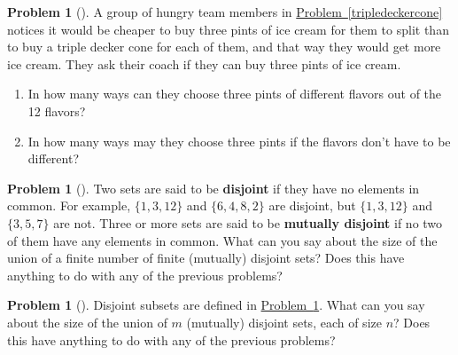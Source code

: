 \documentclass[10pt,]{book}
\newcommand{\terminology}[1]{\textbf{#1}}
\theoremstyle{plain}
\theoremstyle{definition}
\newtheorem{activity}[project]{Problem}
\theoremstyle{definition}
\numberwithin{equation}{chapter}
\begin{document}
\begin{activity}[] \label{icecreaminpints}
A group of hungry team members in \hyperref[tripledeckercone]{Problem~\ref{tripledeckercone}} notices it would be cheaper to buy three pints of ice cream for them to split than to buy a triple decker cone for each of them, and that way they would get more ice cream. They ask their coach if they can buy three pints of ice cream.%
\begin{enumerate}[font=\bfseries,label=(\alph*),ref=\alph*]
\item\label{task-11} \marginsymbol[-2.5em]{} In how many ways can they choose three pints of different flavors out of the 12 flavors?%
\item\label{task-12} \marginsymbol[-2.5em]{} In how many ways may they choose three pints if the flavors don't have to be different?%
\end{enumerate}
\end{activity}
\begin{activity}[] \label{sum}
Two sets are said to be \terminology{disjoint} if they have no elements in common. For example, \(\{1,3,12\}\) and \(\{6, 4, 8, 2\}\) are disjoint, but \(\{1,3,12\}\) and \(\{3,5,7\}\) are not. Three or more sets are said to be \terminology{mutually disjoint} if no two of them have any elements in common. What can you say about the size of the union of a finite number of finite (mutually) disjoint sets? Does this have anything to do with any of the previous problems?%
\end{activity}
\begin{activity}[] \label{product}
Disjoint subsets are defined in \hyperref[sum]{Problem~\ref{sum}}. What can you say about the size of the union of \(m\) (mutually) disjoint sets, each of size \(n\)? Does this have anything to do with any of the previous problems?%
\end{activity}
\typeout{************************************************}
\typeout{************************************************}
\end{document}
